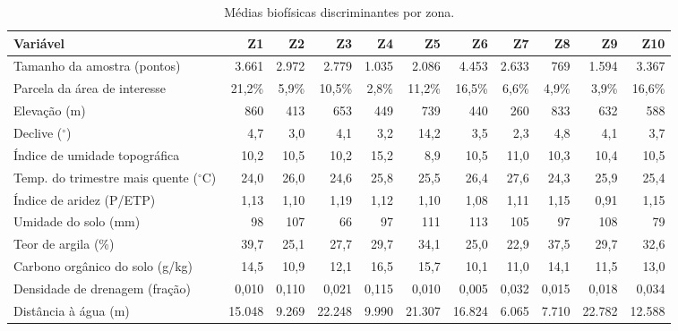 \begin{table}[H]
\centering
\caption{Médias biofísicas discriminantes por zona.}
\label{tab:zone-means}
\scriptsize
\begin{tabular}{@{}lrrrrrrrrrr@{}}
\toprule
Variável & Z1 & Z2 & Z3 & Z4 & Z5 & Z6 & Z7 & Z8 & Z9 & Z10 \\
\midrule
Tamanho da amostra (pontos)          & 3.661 & 2.972 & 2.779 & 1.035 & 2.086 & 4.453 & 2.633 & 769 & 1.594 & 3.367 \\
Parcela da área de interesse         & 21,2\% & 5,9\% & 10,5\% & 2,8\% & 11,2\% & 16,5\% & 6,6\% & 4,9\% & 3,9\% & 16,6\% \\
Elevação (m)                         & 860 & 413 & 653 & 449 & 739 & 440 & 260 & 833 & 632 & 588 \\
Declive ($^\circ$)                   & 4,7 & 3,0 & 4,1 & 3,2 & 14,2 & 3,5 & 2,3 & 4,8 & 4,1 & 3,7 \\
Índice de umidade topográfica        & 10,2 & 10,5 & 10,2 & 15,2 & 8,9 & 10,5 & 11,0 & 10,3 & 10,4 & 10,5 \\
Temp. do trimestre mais quente ($^\circ$C) & 24,0 & 26,0 & 24,6 & 25,8 & 25,5 & 26,4 & 27,6 & 24,3 & 25,9 & 25,4 \\
Índice de aridez (P/ETP)             & 1,13 & 1,10 & 1,19 & 1,12 & 1,10 & 1,08 & 1,11 & 1,15 & 0,91 & 1,15 \\
Umidade do solo (mm)                 & 98 & 107 & 66 & 97 & 111 & 113 & 105 & 97 & 108 & 79 \\
Teor de argila (\%)                  & 39,7 & 25,1 & 27,7 & 29,7 & 34,1 & 25,0 & 22,9 & 37,5 & 29,7 & 32,6 \\
Carbono orgânico do solo (g/kg)      & 14,5 & 10,9 & 12,1 & 16,5 & 15,7 & 10,1 & 11,0 & 14,1 & 11,5 & 13,0 \\
Densidade de drenagem (fração)       & 0,010 & 0,110 & 0,021 & 0,115 & 0,010 & 0,005 & 0,032 & 0,015 & 0,018 & 0,034 \\
Distância à água (m)                 & 15.048 & 9.269 & 22.248 & 9.990 & 21.307 & 16.824 & 6.065 & 7.710 & 22.782 & 12.588 \\
\bottomrule
\end{tabular}
\end{table}


